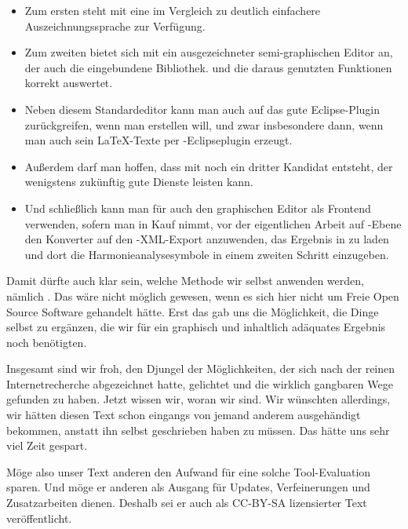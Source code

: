 \begin{itemize}
  \item Zum ersten steht mit  eine im Vergleich zu 
  deutlich einfachere Auszeichnungssprache zur Verfügung.
  \item Zum zweiten bietet sich mit  ein ausgezeichneter
  semi-graphischen Editor an, der auch die eingebundene Bibliothek.
    und die daraus genutzten Funktionen korrekt auswertet.
  \item Neben diesem Standardeditor kann man auch auf das gute Eclipse-Plugin
   zurückgreifen, wenn man  erstellen will, und zwar
  insbesondere dann, wenn man auch sein \LaTeX-Texte per
  -Eclipseplugin erzeugt.
  \item Außerdem darf man hoffen, dass mit  noch ein dritter
  Kandidat entsteht, der wenigstens zukünftig gute Dienste leisten kann.
  \item Und schließlich kann man für  auch den graphischen Editor
   als Frontend verwenden, sofern man in Kauf nimmt, vor der
  eigentlichen Arbeit auf -Ebene den Konverter
   auf den -XML-Export anzuwenden, das Ergebnis
  in  zu laden und dort die Harmonieanalysesymbole in einem
  zweiten Schritt einzugeben.
\end{itemize}

Damit dürfte auch klar sein, welche Methode wir selbst anwenden werden, nämlich
. Das wäre nicht möglich gewesen, wenn
es sich hier nicht um Freie Open Source Software gehandelt hätte. Erst das gab
uns die Möglichkeit, die Dinge selbst zu ergänzen, die wir für ein
graphisch und inhaltlich adäquates Ergebnis noch benötigten.

Insgesamt sind wir froh, den Djungel der Möglichkeiten, der sich nach der reinen
Internetrecherche abgezeichnet hatte, gelichtet und die wirklich gangbaren Wege
gefunden zu haben. Jetzt wissen wir, woran wir sind. Wir wünschten allerdings,
wir hätten diesen Text schon eingangs von jemand anderem ausgehändigt bekommen,
anstatt ihn selbst geschrieben haben zu müssen. Das hätte uns sehr viel Zeit
gespart.

Möge also unser Text anderen den Aufwand für eine solche Tool-Evaluation sparen.
Und möge er anderen als Ausgang für Updates, Verfeinerungen und Zusatzarbeiten
dienen. Deshalb sei er auch als CC-BY-SA lizensierter Text veröffentlicht.

